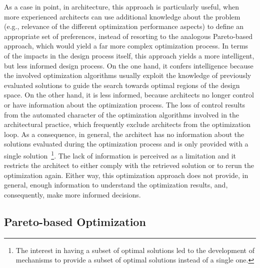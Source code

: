 	As a case in point, in architecture, this approach is particularly useful, when more experienced architects can use additional knowledge about the problem (e.g., relevance of the different optimization performance aspects) to define an appropriate set of preferences, instead of resorting to the analogous Pareto-based approach, which would yield a far more complex optimization process. In terms of the impacts in the design process itself, this approach yields a more intelligent, but less informed design process. On the one hand, it confers intelligence because the involved optimization algorithms usually exploit the knowledge of previously evaluated solutions to guide the search towards optimal regions of the design space. On the other hand, it is less informed, because architects no longer control or have information about the optimization process. The loss of control results from the automated character of the optimization algorithms involved in the architectural practice, which frequently exclude architects from the optimization loop. As a consequence, in general, the architect has no information about the solutions evaluated during the optimization process and is only provided with a single solution~\cite{Custodio2010}\footnote{The interest in having a subset of optimal solutions led to the development of mechanisms to provide a subset of optimal solutions instead of a single one.}. The lack of information is perceived as a limitation \cite{Cichocka2017SURVEY} and it restricts the architect to either comply with the retrieved solution or to rerun the optimization again. Either way, this optimization approach does not provide, in general, enough information to understand the optimization results, and, consequently, make more informed decisions. 
	
	\subsection{Pareto-based Optimization}
	\label{ssec:pareto}
	
